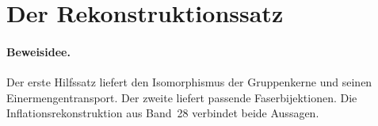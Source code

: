 \documentclass[main.tex]{subfiles}
\begin{document}
\section{Der Rekonstruktionssatz}

\paragraph{Beweisidee.}
Der erste Hilfssatz liefert den Isomorphismus der Gruppenkerne und seinen
Einermengentransport. Der zweite liefert passende Faserbijektionen.
Die Inflationsrekonstruktion aus Band~28 verbindet beide Aussagen.

\par\noindent\begin{minipage}{\linewidth}
\end{minipage}\par
\end{document}
